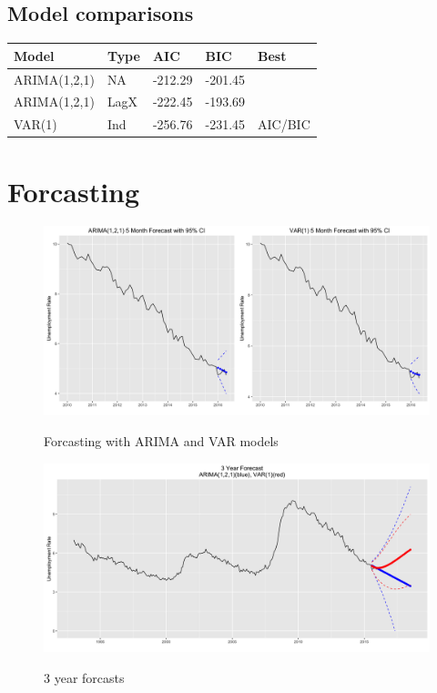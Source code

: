 \documentclass[twoside,twocolumn]{article}
\begin{document}
\subsection{Model comparisons}

\begin{table}[H]
\centering
\begin{tabular}{lllll}
  \hline
Model & Type & AIC & BIC & Best \\ 
  \hline
ARIMA(1,2,1) & NA &   -212.29 & -201.45 &  \\ 
ARIMA(1,2,1) & LagX   & -222.45 & -193.69 &  \\ 
VAR(1) & Ind & -256.76 & -231.45 & AIC/BIC \\ 
   \hline
\end{tabular}
\end{table}


\section{Forcasting}

 \begin{figure}[H]
    	\centering
     	\caption{Forcasting with ARIMA and VAR models}
     	\includegraphics[width=\linewidth]{images/forcasts}
     	\label{fig:forcasts}
      \end{figure}
      
       \begin{figure}[H]
    	\centering
     	\caption{3 year forcasts}
     	\includegraphics[width=\linewidth]{images/forcast3}
     	\label{fig:forcasts2}
      \end{figure}
      
\end{document}
